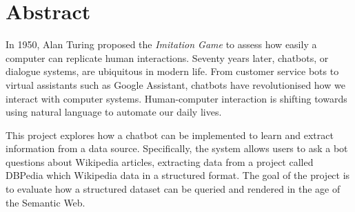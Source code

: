 \chapter*{Abstract}
In 1950, Alan Turing proposed the {\it Imitation Game} to assess how easily a computer can replicate human interactions. Seventy years later, chatbots, or dialogue systems, are ubiquitous in modern life. From customer service bots to virtual assistants such as Google Assistant, chatbots have revolutionised how we interact with computer systems. Human-computer interaction is shifting towards using natural language to automate our daily lives.

This project explores how a chatbot can be implemented to learn and extract information from a data source. Specifically, the system allows users to ask a bot questions about Wikipedia articles, extracting data from a project called DBPedia which Wikipedia data in a structured format. The goal of the project is to evaluate how a structured dataset can be queried and rendered in the age of the Semantic Web.